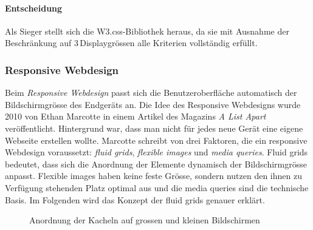 \paragraph*{Entscheidung}
Als Sieger stellt sich die W3.css-Bibliothek heraus, da sie mit Ausnahme der Beschränkung auf 3\,Displaygrössen alle Kriterien vollständig erfüllt.


\subsubsection{Responsive Webdesign}
\label{subsec:responsiveFactors}
Beim \emph{Responsive Webdesign} passt sich die Benutzeroberfläche automatisch der Bildschirmgrösse des Endgeräts an. Die Idee des Responsive Webdesigns wurde 2010 von Ethan Marcotte in einem Artikel des Magazins \emph{A List Apart}~\cite{EthMarRWD} veröffentlicht. Hintergrund war, dass man nicht für jedes neue Gerät eine eigene Webseite erstellen wollte. Marcotte schreibt von drei Faktoren, die ein responsive Webdesign voraussetzt: \emph{fluid grids}, \emph{flexible images} und \emph{media queries}. Fluid grids bedeutet, dass sich die Anordnung der Elemente dynamisch der Bildschirmgrösse anpasst. Flexible images haben keine feste Grösse, sondern nutzen den ihnen zu Verfügung stehenden Platz optimal aus und die media queries sind die technische Basis. Im Folgenden wird das Konzept der fluid grids genauer erklärt.

\begin{figure}[htb!]
	\centering
	\caption{Anordnung der Kacheln auf grossen und kleinen Bildschirmen}
	\label{img:kacheln2}
\end{figure}

